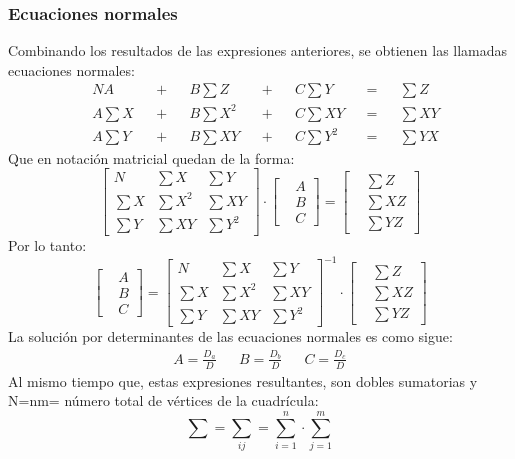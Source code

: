 \subsubsection{Ecuaciones normales}
Combinando los resultados de las expresiones anteriores, se obtienen las llamadas ecuaciones normales:
\begin{align*}
  &NA       &&+ &&B \sum Z  &&+ &&C\sum Y   &&= &&\sum Z\\
  &A \sum X &&+ &&B\sum X^2 &&+ &&C\sum XY  &&= &&\sum XY\\
  &A\sum Y  &&+ &&B\sum XY  &&+ &&C\sum Y^2 &&= &&\sum YX
\end{align*}
Que en notación matricial quedan de la forma:
\begin{equation*}
  \begin{bmatrix}
      N&\sum X&\sum Y\\
      \sum X&\sum X^2&\sum XY\\
      \sum Y&\sum XY&\sum Y^2
  \end{bmatrix} \cdot \begin{bmatrix}
      &A\\
      &B\\
      &C
  \end{bmatrix} = \begin{bmatrix}
    &\sum Z\\
    &\sum XZ\\
    &\sum YZ
\end{bmatrix}
\end{equation*}
Por lo tanto:
\begin{equation}
  \begin{bmatrix}
    &A\\
    &B\\
    &C
\end{bmatrix} =
  \begin{bmatrix}
      N&\sum X&\sum Y\\
      \sum X&\sum X^2&\sum XY\\
      \sum Y&\sum XY&\sum Y^2
  \end{bmatrix}^{- 1} \cdot \begin{bmatrix}
    &\sum Z\\
    &\sum XZ\\
    &\sum YZ
\end{bmatrix}
\end{equation}
La solución por determinantes de las ecuaciones normales es como sigue:
\begin{align*}
  A = \frac{D_a}{D}&&B = \frac{D_b}{D}&& C = \frac{D_c}{D}
\end{align*}
Al mismo tiempo que, estas expresiones resultantes, son dobles sumatorias y N=nm= número total de vértices de la cuadrícula:
\begin{equation}
  \sum = \sum_{ij} =\sum_{i = 1}^{n}\cdot\sum_{j = 1}^{m}
\end{equation}
